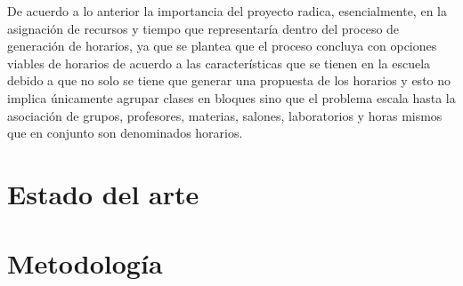 	De acuerdo a lo anterior la importancia del proyecto radica, esencialmente, en la asignación de recursos y tiempo que representaría dentro del proceso de generación de horarios, ya que se plantea que el proceso concluya con opciones viables de horarios de acuerdo a las características que se tienen en la escuela debido a que no solo se tiene que generar una propuesta de los horarios y esto no implica únicamente agrupar clases en bloques sino que el problema escala hasta la asociación de grupos, profesores, materias, salones, laboratorios y horas mismos que en conjunto son denominados horarios.
	
\section{Estado del arte}
	

\section{Metodología}
	
	
	
	